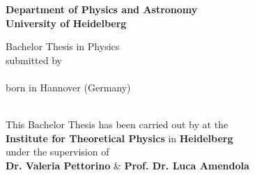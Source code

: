 \begin{titlepage}
\begin{center}
\makeatletter

\Large\textbf{Department of Physics and Astronomy\\
University of Heidelberg}

\vfill

\normalsize
Bachelor Thesis in Physics\\
submitted by\\[0.5cm]
\Large\textbf{\@author}\\[0.2cm]
\normalsize
born in Hannover (Germany)\\[0.5cm]
\Large\textbf{\@date}\\[0.5cm]
\normalsize


\newpage
\thispagestyle{empty}


\LARGE\textbf{\@title}

\vfill

\normalsize
This Bachelor Thesis has been carried out by \textbf{\@author} at the\\
\textbf{Institute for Theoretical Physics} in \textbf{Heidelberg}\\
under the supervision of\\
\textbf{Dr. Valeria Pettorino} \& \textbf{Prof. Dr. Luca Amendola}

\makeatother
\end{center}
\end{titlepage}
